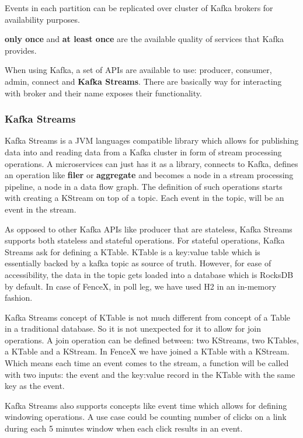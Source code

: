 \documentclass[a4]{report}
\begin{document}
        Events in each partition can be replicated over cluster of Kafka brokers for availability purposes.

        \textbf{only once} and \textbf{at least once} are the available quality of services that Kafka provides.

        When using Kafka, a set of APIs are available to use: producer, consumer, admin, connect and \textbf{Kafka Streams}.
        There are basically way for interacting with broker and their name exposes their functionality.

        \subsubsection{Kafka Streams \cite{kafkaStreamsJoins}}
        Kafka Streams is a JVM languages compatible library which allows for publishing data into and reading data from a
        Kafka cluster in form of stream processing operations.
        A microservices can just has it as a library, connects to Kafka, defines an operation like \textbf{filer} or
        \textbf{aggregate} and becomes a node in a stream processing pipeline, a node in a data flow graph.
        The definition of such operations starts with creating a KStream on top of a topic.
        Each event in the topic, will be an event in the stream.

        As opposed to other Kafka APIs like producer that are stateless, Kafka Streams supports both stateless and
        stateful operations.
        For stateful operations, Kafka Streams ask for defining a KTable.
        KTable is a key:value table which is essentially backed by a kafka topic as source of truth.
        However, for ease of accessibility, the data in the topic gets loaded into a database which is RocksDB by default.
        In case of FenceX, in poll leg, we have used H2 in an in-memory fashion.

        Kafka Streams concept of KTable is not much different from concept of a Table in a traditional database.
        So it is not unexpected for it to allow for join operations.
        A join operation can be defined between: two KStreams, two KTables, a KTable and a KStream.
        In FenceX we have joined a KTable with a KStream.
        Which means each time an event comes to the stream, a function will be called with two inputs: the event and the
        key:value record in the KTable with the same key as the event.

        Kafka Streams also supports concepts like event time which allows for defining windowing operations.
        A use case could be counting number of clicks on a link during each 5 minutes window when each click results in
        an event.
\end{document}
